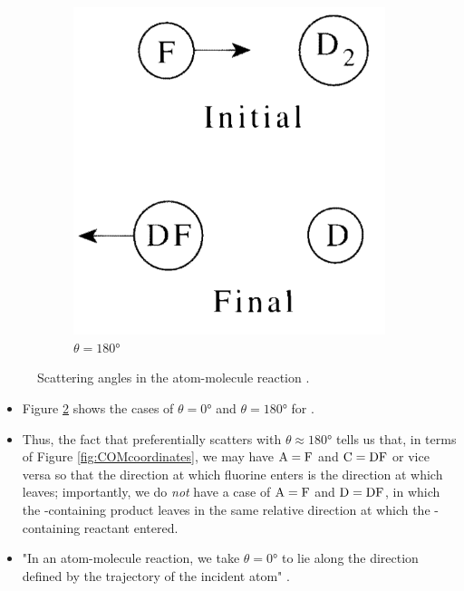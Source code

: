 \documentclass[../notes.tex]{subfiles}
\begin{document}
\begin{itemize}
\begin{figure}[h!]
\begin{subfigure}[b]{0.25\linewidth}
            \includegraphics[width=0.7\linewidth]{../ExtFiles/FD2scatteringb.png}
            \caption{$\theta=\ang{180}$}
            \label{fig:FD2scatteringb}
        \end{subfigure}
        \caption{Scattering angles in the atom-molecule reaction .}
        \label{fig:FD2scattering}
    \end{figure}
    \begin{itemize}
        \item Figure \ref{fig:FD2scattering} shows the cases of $\theta=\ang{0}$ and $\theta=\ang{180}$ for .
        \item Thus, the fact that  preferentially scatters with $\theta\approx\ang{180}$ tells us that, in terms of Figure \ref{fig:COMcoordinates}, we may have $\ce{A}=\ce{F}$ and $\ce{C}=\ce{DF}$ or vice versa so that the direction at which fluorine enters is the direction at which  leaves; importantly, we do \emph{not} have a case of $\ce{A}=\ce{F}$ and $\ce{D}=\ce{DF}$, in which the -containing product leaves in the same relative direction at which the -containing reactant entered.
        \item "In an atom-molecule reaction, we take $\theta=\ang{0}$ to lie along the direction defined by the trajectory of the incident atom" \parencite[1252]{bib:McQuarrieSimon}.

\end{itemize}
\end{itemize}
\end{document}
